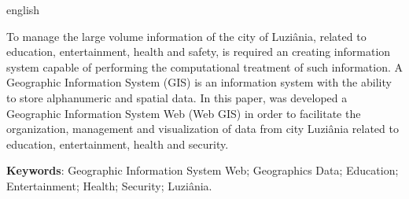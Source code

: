 \begin{resumo}[Abstract]
 \begin{otherlanguage*}{english}

To manage the large volume information of the city of Luziânia, related to education, entertainment, health and safety, is required an creating information system capable of performing the computational treatment of such information. A Geographic Information System (GIS) is an information system with the ability to store alphanumeric and spatial data. In this paper, was developed a Geographic Information System Web (Web GIS) in order to facilitate the organization, management and visualization of data from city Luziânia related to education, entertainment, health and security.

   \vspace{\onelineskip}

   \noindent
   \textbf{Keywords}: Geographic Information System Web; Geographics Data; Education; Entertainment; Health; Security; Luziânia.
   
 \end{otherlanguage*}
\end{resumo} 